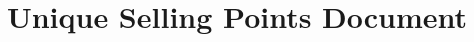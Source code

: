 \documentclass{article}
\title{\projectname Unique Selling Points Document}
\date{\docdate}
\author{\authorname}
\begin{document}
\maketitle
\newpage

\tableofcontents
\newpage


\newpage

\printglossary

\glsaddall
\end{document}
